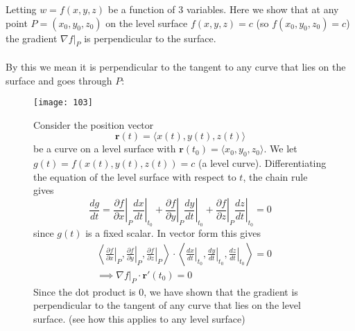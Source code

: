 \documentclass{report}
\begin{document}
Letting $w=f(x,y,z)$ be a function of 3 variables. Here we show that at any point $P=(x_0,y_0,z_0)$ on the 
level surface $f(x,y,z)=c$ (so $f(x_0,y_0,z_0)=c$) the 
gradient $\nabla f|_P$ is perpendicular to the surface.\\
\vspace{1mm}\\
By this we mean it is perpendicular to the tangent to any curve that lies on the surface and goes through $P$:
\begin{figure}[h]
\begin{center}
\texttt{[image: 103]}\\
\end{center}
Consider the position vector
\begin{equation*}
\bm{r}(t)=\langle x(t),y(t),z(t)\rangle
\end{equation*}
be a curve on a level surface with $\bm{r}(t_0)=\langle x_0,y_0,z_0\rangle$. 
We let $g(t)=f(x(t),y(t),z(t))=c$ (a level curve).
Differentiating the equation of the level surface with respect to $t$, the chain rule gives
\begin{equation*}
\frac{dg}{dt}=\left.\frac{\partial f}{\partial x}\right|_P
\left.\frac{dx}{dt}\right|_{t_0}+
\left.\frac{\partial f}{\partial y}\right|_P\left.\frac{dy}{dt}\right|_{t_0}+
\left.\frac{\partial f}{\partial z}\right|_P\left.\frac{dz}{dt}\right|_{t_0}=0
\end{equation*}
since $g(t)$ is a fixed scalar. In vector form this gives
\begin{align*}
&\left\langle\left.\frac{\partial f}{\partial x}\right|_P,
\left.\frac{\partial f}{\partial y}\right|_P,
\left.\frac{\partial f}{\partial z}\right|_P\right\rangle
\cdot\left\langle\left.\frac{dx}{dt}\right|_{t_0},
\left.\frac{dy}{dt}\right|_{t_0},
\left.\frac{dz}{dt}\right|_{t_0}\right\rangle=0\\
&\implies\nabla f|_P\cdot\bm{r}'(t_0)=0
\end{align*}
Since the dot product is 0, we have shown that the gradient is perpendicular to the tangent of any curve that
lies on the level surface. (see how this applies to
any level surface)
\end{figure}
\newpage

\subsection{}
\end{document}
